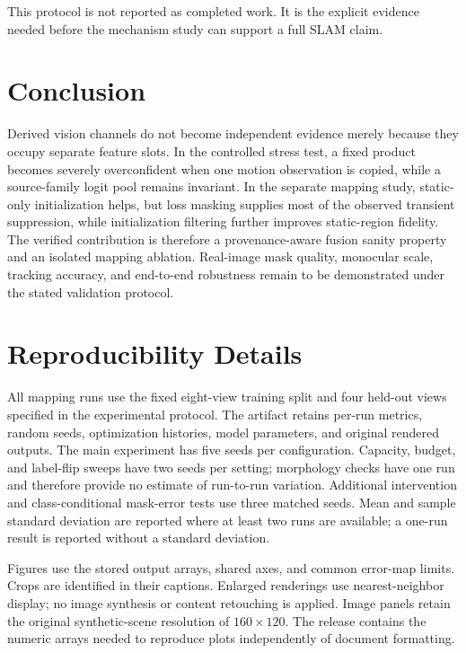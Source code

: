 \documentclass[10pt,conference]{IEEEtran}
\begin{document}
This protocol is not reported as completed work. It is the explicit evidence needed before the mechanism study can support a full SLAM claim.

\section{Conclusion}
Derived vision channels do not become independent evidence merely because they occupy separate feature slots. In the controlled stress test, a fixed product becomes severely overconfident when one motion observation is copied, while a source-family logit pool remains invariant. In the separate mapping study, static-only initialization helps, but loss masking supplies most of the observed transient suppression, while initialization filtering further improves static-region fidelity. The verified contribution is therefore a provenance-aware fusion sanity property and an isolated mapping ablation. Real-image mask quality, monocular scale, tracking accuracy, and end-to-end robustness remain to be demonstrated under the stated validation protocol.


\appendices
\section{Reproducibility Details}
All mapping runs use the fixed eight-view training split and four held-out views specified in the experimental protocol. The artifact retains per-run metrics, random seeds, optimization histories, model parameters, and original rendered outputs. The main experiment has five seeds per configuration. Capacity, budget, and label-flip sweeps have two seeds per setting; morphology checks have one run and therefore provide no estimate of run-to-run variation. Additional intervention and class-conditional mask-error tests use three matched seeds. Mean and sample standard deviation are reported where at least two runs are available; a one-run result is reported without a standard deviation.

Figures use the stored output arrays, shared axes, and common error-map limits. Crops are identified in their captions. Enlarged renderings use nearest-neighbor display; no image synthesis or content retouching is applied. Image panels retain the original synthetic-scene resolution of $160\times120$. The release contains the numeric arrays needed to reproduce plots independently of document formatting.



\end{document}
